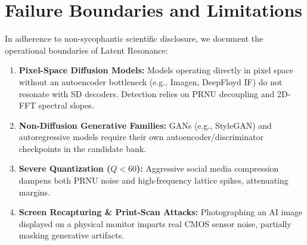 \documentclass[letterpaper]{article}
\begin{document}
\begin{table}[t]
\caption{Empirical Forensic Telemetry on $N=1,000$ Benchmark.}
\label{tab:metrics}
\centering
\small
{}
\end{table}

\section{Failure Boundaries and Limitations}
\label{sec:limitations}

In adherence to non-sycophantic scientific disclosure, we document the operational boundaries of Latent Resonance:
\begin{enumerate}
    \item \textbf{Pixel-Space Diffusion Models:} Models operating directly in pixel space without an autoencoder bottleneck (e.g., Imagen, DeepFloyd IF) do not resonate with SD decoders. Detection relies on PRNU decoupling and 2D-FFT spectral slopes.
    \item \textbf{Non-Diffusion Generative Families:} GANs (e.g., StyleGAN) and autoregressive models require their own autoencoder/discriminator checkpoints in the candidate bank.
    \item \textbf{Severe Quantization ($Q < 60$):} Aggressive social media compression dampens both PRNU noise and high-frequency lattice spikes, attenuating margins.
    \item \textbf{Screen Recapturing \& Print-Scan Attacks:} Photographing an AI image displayed on a physical monitor imparts real CMOS sensor noise, partially masking generative artifacts.
\end{enumerate}
\end{document}
